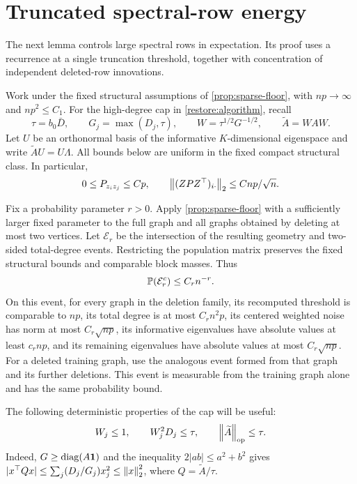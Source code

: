\section{Truncated spectral-row energy}
\label{restore:tail-section}

The next lemma controls large spectral rows in expectation. Its proof
uses a recurrence at a single truncation threshold, together with
concentration of independent deleted-row innovations.

Work under the fixed structural assumptions of
\cref{prop:sparse-floor}, with $np\to\infty$ and $np^2\le C_1$.
For the high-degree cap in \cref{restore:algorithm}, recall
\[
 \tau=b_0\bar D,\qquad
 G_j=\max(D_j,\tau),\qquad
 W=\tau^{1/2}G^{-1/2},\qquad \widetilde A=WAW.
\]
Let $U$ be an orthonormal basis of the informative $K$-dimensional
eigenspace and write $\widetilde AU=U\Lambda$.
All bounds below are uniform in the fixed compact structural class.
In particular,
\begin{equation}
 0\le{P_{z_i z_j}}\le Cp,\qquad
 \left\lVert{(ZPZ^\top)_{i\cdot}}\right\rVert_2\le C{np}/\sqrt n.
 \label{restore:tail-population-rows}
\end{equation}

Fix a probability parameter $r>0$.  Apply
\cref{prop:sparse-floor} with a sufficiently larger fixed parameter to
the full graph and all graphs obtained by deleting at most two vertices.
Let $\mathcal E_r$ be the intersection of the resulting geometry and
two-sided total-degree events.  Restricting the population matrix
preserves the fixed structural bounds and comparable block masses.
Thus
\begin{equation}
 \mathbb P(\mathcal E_r^c)\le C_rn^{-r}.
 \label{restore:tail-geometry-probability}
\end{equation}
On this event, for every graph in the deletion family, its recomputed
threshold is comparable to ${np}$, its total degree is at most $C_r{n^2p}$,
its centered weighted noise has norm at most $C_r\sqrt {np}$, its
informative eigenvalues have absolute values at least $c_r{np}$, and its
remaining eigenvalues have absolute values at most $C_r\sqrt {np}$.
For a deleted training graph, use the analogous event formed from
that graph and its further deletions. This event is measurable from
the training graph alone and has the same probability bound.

The following deterministic properties of the cap will be useful:
\begin{equation}
 W_j\le1,\qquad W_j^2D_j\le\tau,
 \qquad \left\lVert\widetilde A\right\rVert_{\mathrm{op}}\le\tau.
 \label{restore:tail-floor-operator}
\end{equation}
Indeed, $G\ge\operatorname{diag}(A\mathbf 1)$ and the inequality
$2|ab|\le a^2+b^2$ gives
$|x^\top Qx|\le\sum_j(D_j/G_j)x_j^2\le\left\lVert x\right\rVert_2^2$,
where $Q=\widetilde A/\tau$.

